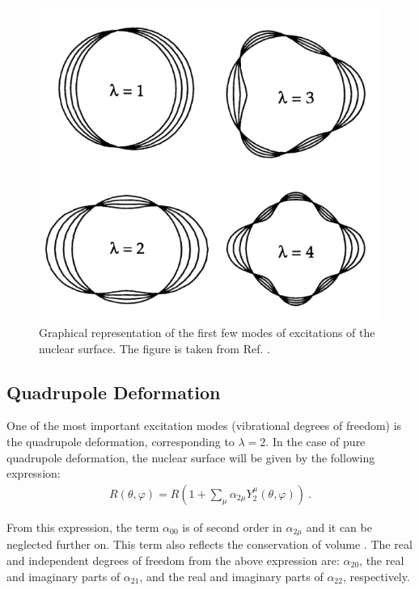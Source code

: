 \begin{figure}
    \centering
    \includegraphics[scale=0.3]{Chapters/Figures/nuclearDeformation.png}
    \caption{Graphical representation of the first few modes of excitations of the nuclear surface. The figure is taken from Ref. \cite{greiner1996nuclear}.}
    \label{multipole-deformations}
\end{figure}

\subsection{Quadrupole Deformation}

One of the most important excitation modes (vibrational degrees of freedom) is the quadrupole deformation, corresponding to $\lambda=2$. In the case of pure quadrupole deformation, the nuclear surface will be given by the following expression:
\begin{align}
    R(\theta,\varphi)=R\left(1+\sum_\mu\alpha_{2\mu}Y_2^\mu(\theta,\varphi)\right)\ . \label{quadrupole-surface}
\end{align}

From this expression, the term $\alpha_{00}$ is of second order in $\alpha_{2\mu}$ and it can be neglected further on. This term also reflects the conservation of volume \cite{greiner1996nuclear,ring2004nuclear}. The real and independent degrees of freedom from the above expression are: $\alpha_{20}$, the real and imaginary parts of $\alpha_{21}$, and the real and imaginary parts of $\alpha_{22}$, respectively.

